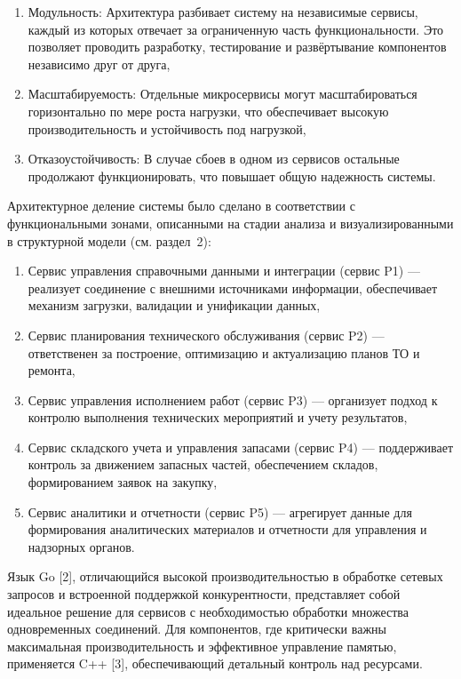 \documentclass[14pt,a4paper]{extarticle}
\begin{document}
\begin{enumerate}
\item Модульность: Архитектура разбивает систему на независимые сервисы, каждый из которых отвечает за ограниченную часть функциональности. Это позволяет проводить разработку, тестирование и развёртывание компонентов независимо друг от друга,
\item Масштабируемость: Отдельные микросервисы могут масштабироваться горизонтально по мере роста нагрузки, что обеспечивает высокую производительность и устойчивость под нагрузкой,
\item Отказоустойчивость: В случае сбоев в одном из сервисов остальные продолжают функционировать, что повышает общую надежность системы.
\end{enumerate}

Архитектурное деление системы было сделано в соответствии с функциональными зонами, описанными на стадии анализа и визуализированными в структурной модели (см. раздел~2):

\begin{enumerate}
\item Сервис управления справочными данными и интеграции (сервис P1) — реализует соединение с внешними источниками информации, обеспечивает механизм загрузки, валидации и унификации данных,
\item Сервис планирования технического обслуживания (сервис P2) — ответственен за построение, оптимизацию и актуализацию планов ТО и ремонта,
\item Сервис управления исполнением работ (сервис P3) — организует подход к контролю выполнения технических мероприятий и учету результатов,
\item Сервис складского учета и управления запасами (сервис P4) — поддерживает контроль за движением запасных частей, обеспечением складов, формированием заявок на закупку,
\item Сервис аналитики и отчетности (сервис P5) — агрегирует данные для формирования аналитических материалов и отчетности для управления и надзорных органов.
\end{enumerate}

Язык Go [2], отличающийся высокой производительностью в обработке сетевых запросов и встроенной поддержкой конкурентности, представляет собой идеальное решение для сервисов с необходимостью обработки множества одновременных соединений. Для компонентов, где критически важны максимальная производительность и эффективное управление памятью, применяется C++ [3], обеспечивающий детальный контроль над ресурсами.
\end{document}
